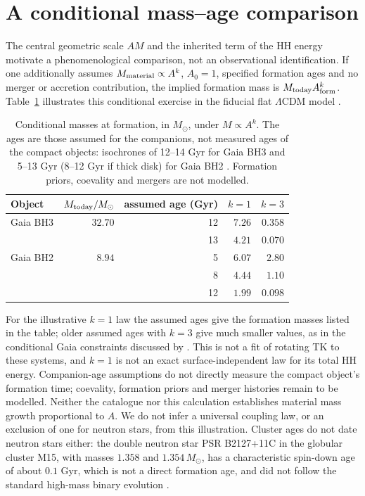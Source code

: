 \documentclass[12pt]{iopart}
\theoremstyle{plain}
\theoremstyle{definition}
\theoremstyle{remark}
\begin{document}
\section{A conditional mass--age comparison}
\label{app:mass-age}

The central geometric scale $AM$ and the inherited term of the HH
energy motivate a phenomenological comparison, not an observational
identification. If one additionally assumes
$M_{\rm material}\propto A^k$, $A_0=1$, specified formation ages and
no merger or accretion contribution, the implied formation mass is
$M_{\rm today}A_{\rm form}^k$.
Table~\ref{tab:obs-birth-mass} illustrates this conditional exercise
in the fiducial flat $\Lambda$CDM model \cite{Planck2020VI}.

\begin{table}[ht]
\centering\small
\begin{tabular}{lrrrr}
\hline
Object & $M_{\rm today}/M_\odot$ & assumed age (Gyr) & $k=1$ & $k=3$\\
\hline
Gaia BH3 & $32.70$ & 12 & $7.26$ & $0.358$\\
         &         & 13 & $4.21$ & $0.070$\\
Gaia BH2 & $8.94$ & 5 & $6.07$ & $2.80$\\
         &        & 8 & $4.44$ & $1.10$\\
         &        & 12 & $1.99$ & $0.098$\\
\hline
\end{tabular}
\caption{Conditional masses at formation, in $M_\odot$, under $M\propto A^k$.
The ages are those assumed for the companions, not measured ages of the compact
objects: isochrones of 12--14 Gyr for Gaia BH3 \cite{Gaia2024BH3} and
5--13 Gyr (8--12 Gyr if thick disk) for Gaia BH2 \cite{ElBadry2023BH2}.
Formation priors, coevality and mergers are not modelled.}
\label{tab:obs-birth-mass}
\end{table}

For the illustrative $k=1$ law the assumed ages give the formation masses
listed in the table; older assumed ages with $k=3$ give much smaller
values, as in the conditional Gaia constraints discussed by
\cite{AndraeElBadry2023}. This is not a fit of rotating TK to these
systems, and $k=1$ is not an exact surface-independent law for its
total HH energy. Companion-age assumptions do not directly measure
the compact object's formation time; coevality, formation priors and
merger histories remain to be modelled. Neither the catalogue nor this
calculation establishes material mass growth proportional to $A$.
We do not infer a universal coupling law, or an exclusion of one for
neutron stars, from this illustration. Cluster ages do not date neutron stars
either: the double neutron star PSR B2127+11C in the globular cluster M15, with
masses $1.358$ and $1.354\,M_\odot$, has a characteristic spin-down age of about
$0.1$ Gyr, which is not a direct formation age, and did not follow the standard
high-mass binary evolution \cite{Jacoby2006}.
\end{document}
